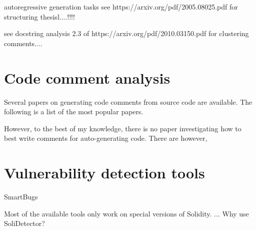 
autoregressive generation tasks
see https://arxiv.org/pdf/2005.08025.pdf for structuring thesisl....!!!!

see docstring analysis 2.3 of https://arxiv.org/pdf/2010.03150.pdf for clustering comments....


\section{Code comment analysis}
\label{sec:code-comment-analysis}

Several papers on generating code comments from source code are available. The following is a list of the most popular papers.

However, to the best of my knowledge, there is no paper investigating how to best write comments for auto-generating code. There are however, 


\section{Vulnerability detection tools}
\label{sec:vulnerability-detection-tools}



SmartBugs

Most of the available tools only work on special versions of Solidity. ... Why use SoliDetector?
